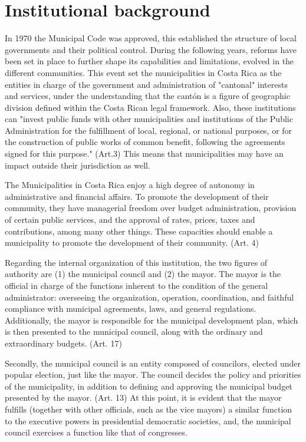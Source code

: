 \section{Institutional background}

In 1970 the Municipal Code was approved, this established the structure of local governments and their political control. During the following years, reforms have been set in place to further shape its capabilities and limitations, evolved in the different communities. \parencite[p. 10]{alfaro2009} This event set the municipalities in Costa Rica as the entities in charge of the government and administration of "cantonal" interests and services, under the understanding that the cantón is a figure of geographic division defined within the Costa Rican legal framework. \parencite[Art. 3]{al1998} Also, these institutions can "invest public funds with other municipalities and institutions of the Public Administration for the fulfillment of local, regional, or national purposes, or for the construction of public works of common benefit, following the agreements signed for this purpose." (Art.3) This means that municipalities may have an impact outside their jurisdiction as well. 

The Municipalities in Costa Rica enjoy a high degree of autonomy in administrative and financial affairs. To promote the development of their community, they have managerial freedom over budget administration, provision of certain public services, and the approval of rates, prices, taxes and contributions, among many other things. These capacities should enable a municipality to promote the development of their community. (Art. 4) 

Regarding the internal organization of this institution, the two figures of authority are (1) the municipal council and (2) the mayor. The mayor is the official in charge of the functions inherent to the condition of the general administrator: overseeing the organization, operation, coordination, and faithful compliance with municipal agreements, laws, and general regulations. Additionally, the mayor is responsible for the municipal development plan, which is then presented to the municipal council, along with the ordinary and extraordinary budgets. (Art. 17)

Secondly, the municipal council is an entity composed of councilors, elected under popular election, just like the mayor. The council decides the policy and priorities of the municipality, in addition to defining and approving the municipal budget presented by the mayor. (Art. 13) At this point, it is evident that the mayor fulfills (together with other officials, such as the vice mayors) a similar function to the executive powers in presidential democratic societies, and, the municipal council exercises a function like that of congresses.

